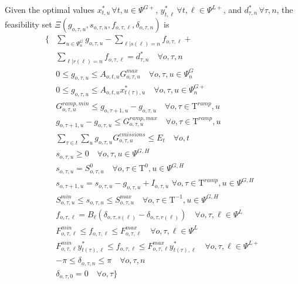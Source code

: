 \documentclass[final]{IEEEtran}
\newcommand{\Tau}{\mathrm{T}}
\begin{document}
Given the optimal values $x_{t, u}^* \, \forall t, u \in \Psi^{G+}$, $y_{t, \ell}^* \, \forall t, \ell \in \Psi^{L+}$, and $d_{\tau, n}^* \, \forall \tau, n$, the feasibility set $\Xi(g_{o, \tau, u}, s_{o, \tau, u}, f_{o, \tau, \ell}, \delta_{o, \tau, n})$ is
\begin{align}
\{ &\sum\limits_{u \in \Psi^G_{n}} g_{o, \tau, u} - \sum\limits_{\ell | s(\ell) = n} f_{o, \tau, \ell} + \nonumber \\
&\sum\limits_{\ell | r(\ell) = n} f_{o, \tau, \ell} = d_{\tau, n}^* \quad \forall o, \tau, n\\
&0 \leq g_{o, \tau, u} \leq A_{o, t, u} G_{o, \tau, u}^{max} \quad \forall o, \tau, u \in \Psi_n^G \\
&0 \leq g_{o, \tau, u} \leq A_{o, t, u} x_{t(\tau), u}^* \quad \forall o, \tau, u \in \Psi_n^{G+} \\
&G^{ramp,min}_{o, \tau, u} \leq g_{o, \tau + 1, u} - g_{o, \tau, u} \quad \forall o, \tau \in \Tau^{ramp}, u \\
&g_{o, \tau + 1, u} - g_{o, \tau, u} \leq G^{ramp,max}_{o, \tau, u} \quad \forall o, \tau \in \Tau^{ramp}, u \\
&\sum\limits_{\tau \in t} \sum\limits_{u} g_{o, \tau, u} G^{emissions}_{o, \tau, u} \leq E_{t} \quad \forall o, t \\
&s_{o, \tau, u} \geq 0 \quad \forall o, \tau, u \in \Psi^{G, H} \\
&s_{o, \tau, u} = S^0_{o, \tau, u} \quad \forall o, \tau \in \Tau^0, u \in \Psi^{G, H} \\
&s_{o, \tau + 1, u} = s_{o, \tau, u} - g_{o, \tau, u} + I_{o, \tau, u} \, \, \forall o, \tau \in \Tau^{ramp}, u \in \Psi^{G, H} \\
&S^{min}_{o, \tau, u} \leq s_{o, \tau, u} \leq S^{max}_{o, \tau, u} \quad \forall o, \tau \in \Tau^{-1}, u \in \Psi^{G, H} \\
&f_{o, \tau, \ell} = B_\ell (\delta_{o, \tau, s(\ell)} - \delta_{o, \tau, r(\ell)}) \quad \forall o, \tau, \ell \in \Psi^L \\
&F_{o, \tau, \ell}^{min} \leq f_{o, \tau, \ell} \leq F_{o, \tau, \ell}^{max} \quad \forall o, \tau, \ell \in \Psi^L \\
&F_{o, \tau, \ell}^{min} y_{t(\tau), \ell}^* \leq f_{o, \tau, \ell} \leq F_{o, \tau, \ell}^{max} y_{t(\tau), \ell}^* \quad \forall o, \tau, \ell \in \Psi^{L+} \\
&-\pi \leq \delta_{o, \tau, n} \leq \pi \quad \forall o, \tau, n \\
&\delta_{o, \tau, 0} = 0 \quad \forall o, \tau \}
\end{align}
\end{document}
